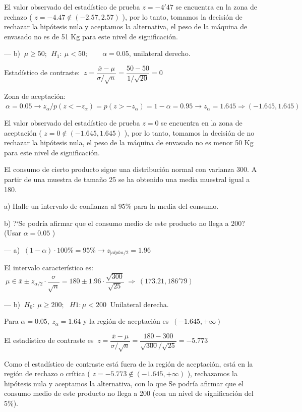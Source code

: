 El valor observado del estadístico de prueba $z=-4'47$ 
se encuentra en la zona de rechazo ( $z=-4.47 \notin (-2.57,2.57)$ ), 
por lo tanto, tomamos la decisión de rechazar la hipótesis nula y aceptamos la alternativa, 
el peso de la máquina de envasado no es de 51 Kg para este nivel de significación.


--- b) $\ \mu\ge 50;\ \ H_1:\ \mu < 50; \qquad \alpha=0.05$, unilateral derecho.

Estadístico de contraste: $\ z=\dfrac{\bar x - \mu}{\sigma/\sqrt{n}}=\dfrac{50-50}{1/\sqrt{20}}=0$

Zona de aceptación: $\ \alpha=0.05 \to z_\alpha / p(z<-z_\alpha)=p(z>-z_\alpha)=1-\alpha=0.95 \to z_\alpha= 1.645 \Rightarrow (-1.645,1.645)$

El valor observado del estadístico de prueba $z=0$ se encuentra en la zona de aceptación ( $z=0 \notin (-1.645,1.645)$ ), por lo tanto, tomamos la decisión de no rechazar la hipótesis nula, el peso de la máquina de envasado no es menor 50 Kg para este nivel de significación.


\vspace{4mm}
\begin{ejemplo}
\begin{ejer}
	El consumo de cierto producto sigue una distribución normal con varianza 300. A partir de una muestra de tamaño 25 se ha obtenido una media muestral igual a 180.
	
a) Halle un intervalo de confianza al 95\% para la media del consumo.

b) ?`Se podría afirmar que el consumo medio de este producto no llega a 200? (Usar $\alpha=0.05$ )
\end{ejer}
\end{ejemplo}

--- a) $\ (1-\alpha)\cdot 100\% =95\% \to z_{|alpha/2}=1.96$

El intervalo característico es: $\ \mu \in \bar x \pm z_{\alpha/2}\cdot \dfrac {\sigma}{\sqrt{n}}=180\pm 1.96 \cdot \dfrac{\sqrt{300}}{\sqrt{25}} \ \Rightarrow \ (173.21 , 186'79 )$

--- b) $\ H_0:\  \mu \ge 200;\ \ \ H1: \mu <200 \ $ Unilateral derecha.

Para $\alpha=0.05,\ z_\alpha=1.64$ y la región de aceptación es $\ (-1.645,+\infty)$ 

El estadístico de contraste es $\ z=\dfrac{\bar x - \mu}{\sigma/\sqrt{n}}=\dfrac{180-300}{\sqrt{300}/\sqrt{25}}=-5.773$

Como el estadístico de contraste está fuera de la región de aceptación, está en la región de rechazo o crítica ( $z=-5.773 \notin (-1.645,+\infty)$ ), rechazamos la hipótesis nula y aceptamos la alternativa, con lo que Se podría afirmar que el consumo medio de este producto no llega a 200 (con un nivel de significación del 5\%).


